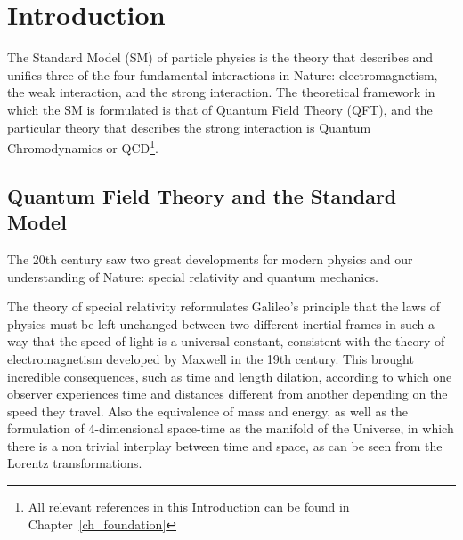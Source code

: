 \chapter*{Introduction}

\label{ch_introduction}



The Standard Model (SM) of particle physics is the theory that describes and unifies three of the four fundamental interactions in Nature: electromagnetism, the weak interaction, and the strong interaction. The theoretical framework in which the SM is formulated is that of Quantum Field Theory (QFT), and the particular theory that describes the strong interaction is Quantum Chromodynamics or QCD\footnote{All relevant references in this Introduction can be found in Chapter~\ref{ch_foundation}}.

\section*{Quantum Field Theory and the Standard Model}

The 20th century saw two great developments for modern physics and our understanding of Nature: special relativity and quantum mechanics. 

The theory of special relativity reformulates Galileo's principle that the laws of physics must be left unchanged between two different inertial frames in such a way that the speed of light is a universal constant, consistent with the theory of electromagnetism developed by Maxwell in the 19th century. This brought incredible consequences, such as time and length dilation, according to which one observer experiences time and distances different from another depending on the speed they travel. Also the equivalence of mass and energy, as well as the formulation of 4-dimensional space-time as the manifold of the Universe, in which there is a non trivial interplay between time and space, as can be seen from the Lorentz transformations.


